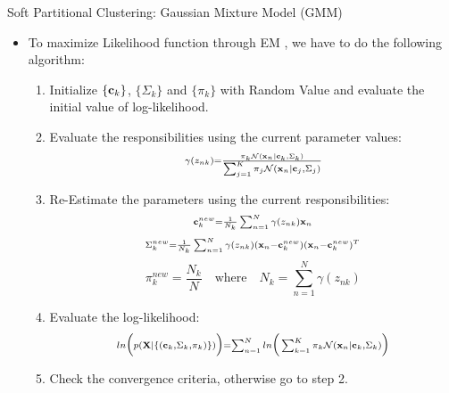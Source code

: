 \documentclass[compress,oilve]{beamer}
\begin{document}
\begin{frame}{Soft Partitional Clustering: Gaussian Mixture Model (GMM)}
\begin{itemize}
\item To maximize Likelihood function through EM , we have to do the following algorithm:
	\begin{enumerate}
		\item Initialize $ \{\mathbf{c_{\mathnormal k}} \}$, $\{\Sigma_{k}\}$ and $\{ \pi_{k}\}$ with Random Value and evaluate the initial value of log-likelihood.
		\item Evaluate the responsibilities using the current parameter values:
				$${\scriptstyle \gamma(z_{nk}) = \frac{\pi_{k} \mathcal{N}(\mathbf{x_{\mathnormal n}} \mid \mathbf{c_{\mathnormal k}}, \Sigma_{k})}{\scriptstyle\sum_{j=1}^{K} \pi_{j} \mathcal{N}(\mathbf{x_{\mathnormal n}} \mid \mathbf{c_{\mathnormal j}}, \Sigma_{j})}}$$
		\item Re-Estimate the parameters using the current responsibilities:
			$$\scriptstyle\mathbf{c_{\mathnormal k}^{\mathnormal {new}}} = \frac{1}{N_{k}} \scriptstyle\sum_{n=1}^{N} \gamma(z_{nk}) \mathbf{x_{\mathnormal n}}$$
			$$\scriptstyle\Sigma_{k}^{new} =  \frac{1}{N_{k}} \scriptstyle\sum_{n=1}^{N} \gamma(z_{nk}) (\mathbf{x_{\mathnormal n}} - \mathbf{c_{\mathnormal k}^{\mathnormal {new}}})(\mathbf{x_{\mathnormal n}} - \mathbf{c_{\mathnormal k}^{\mathnormal {new}}})^{T}$$
			$$\scriptstyle \pi_{k}^{new} =  \frac{N_{k}}{N} \quad \text{where} \quad N_{k} = \scriptstyle\sum_{n=1}^{N} \gamma(z_{nk})$$
		\item Evaluate the log-likelihood:
				$$\scriptstyle ln\Big(p(\mathbf{X} \mid \{ (\mathbf{c_{\mathnormal k}},  \Sigma_{k}, \pi_{k})\})\Big) = \scriptstyle\sum_{n=1}^{N}ln\Big(\scriptstyle\sum_{k=1}^{K} \pi_{k} \mathcal{N}(\mathbf{x_{\mathnormal n}} \mid \mathbf{c_{\mathnormal k}}, \Sigma_{k})\Big)$$
		\item Check the convergence criteria, otherwise go to step 2.	
	\end{enumerate}
\end{itemize}
\end{frame}
\end{document}

